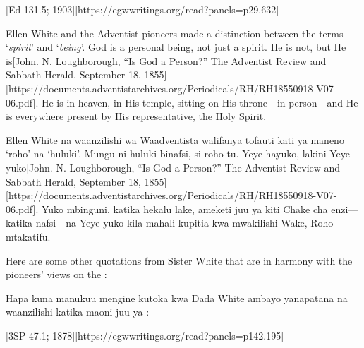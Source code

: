 [Ed 131.5; 1903][https://egwwritings.org/read?panels=p29.632]


Ellen White and the Adventist pioneers made a distinction between the terms ‘\textit{spirit}’ and ‘\textit{being}’. God is a personal being, not just a spirit. He is not, but He is[John. N. Loughborough, “Is God a Person?” The Adventist Review and Sabbath Herald, September 18, 1855][https://documents.adventistarchives.org/Periodicals/RH/RH18550918-V07-06.pdf]. He is in heaven, in His temple, sitting on His throne—in person—and He is everywhere present by His representative, the Holy Spirit.


Ellen White na waanzilishi wa Waadventista walifanya tofauti kati ya maneno ‘roho’ na ‘huluki’. Mungu ni huluki binafsi, si roho tu. Yeye hayuko, lakini Yeye yuko[John. N. Loughborough, “Is God a Person?” The Adventist Review and Sabbath Herald, September 18, 1855][https://documents.adventistarchives.org/Periodicals/RH/RH18550918-V07-06.pdf]. Yuko mbinguni, katika hekalu lake, ameketi juu ya kiti Chake cha enzi—katika nafsi—na Yeye yuko kila mahali kupitia kwa mwakilishi Wake, Roho mtakatifu.


Here are some other quotations from Sister White that are in harmony with the pioneers’ views on the :


Hapa kuna manukuu mengine kutoka kwa Dada White ambayo yanapatana na waanzilishi katika maoni juu ya :


[3SP 47.1; 1878][https://egwwritings.org/read?panels=p142.195]


